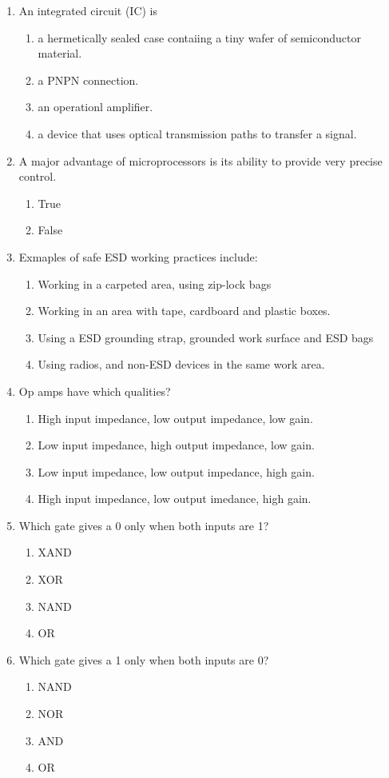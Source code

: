 \documentclass[10pt]{article}
\begin{document}
\begin{multicols}{2}
\begin{enumerate}
\begin{enumerate}
	\end{enumerate}
\item An integrated circuit (IC) is
	\begin{enumerate}
	\item a hermetically sealed case contaiing a tiny wafer of semiconductor material.
	\item a PNPN connection.
	\item an operationl amplifier.
	\item a device that uses optical transmission paths to transfer a signal.
	\end{enumerate}
\item A major advantage of microprocessors is its ability to provide very precise control.
	\begin{enumerate}
	\item True
	\item False
	\end{enumerate}
\item Exmaples of safe ESD working practices include:
	\begin{enumerate}
	\item Working in a carpeted area, using zip-lock bags
	\item Working in an area with tape, cardboard and plastic boxes.
	\item Using a ESD grounding strap, grounded work surface and ESD bags
	\item Using radios, and non-ESD devices in the same work area.
	\end{enumerate}
\item Op amps have which qualities?
	\begin{enumerate}
	\item High input impedance, low output impedance, low gain.
	\item Low input impedance, high output impedance, low gain.
	\item Low input impedance, low output impedance, high gain.
	\item High input impedance, low output imedance, high gain.
	\end{enumerate}
\item Which gate gives a 0 only when both inputs are 1?
	\begin{enumerate}
	\item XAND
	\item XOR
	\item NAND
	\item OR
	\end{enumerate}
\item Which gate gives a 1 only when both inputs are 0?
	\begin{enumerate}
	\item NAND
	\item NOR
	\item AND
	\item OR
	\end{enumerate}
\end{enumerate}
\end{multicols}
\end{document}
